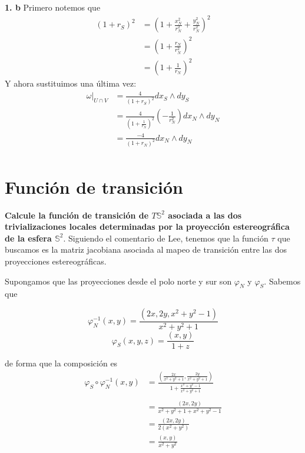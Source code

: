 \documentclass[11pt]{article}
\begin{document}
	\textbf{1. b}
	Primero notemos que
	\begin{equation*}
		\begin{split}
			(1+r_S)^2&=\left(1+\frac{x_N^2}{r_N^2}+\frac{y^2_N}{r^2_N}\right)^2\\
			&=\left(1+\frac{r_N}{r_N^2}\right)^2\\
			&=\left(1+\frac{1}{r_N}\right)^2
		\end{split}
	\end{equation*}
	Y ahora sustituimos una última vez:
	\begin{equation*}
		\begin{split}
			\omega|_{U\cap V}&=\frac{4}{(1+r_S)^2}dx_S\wedge dy_S\\
			&=\frac{4}{\left(1+\frac{1}{r_N}\right)^2}\left(-\frac{1}{r_N^2}\right)dx_N\wedge dy_N\\
			&=\frac{-4}{(1+r_N)^2}dx_N\wedge dy_N\\
		\end{split}
	\end{equation*}
	
	\newpage
	\section{Función de transición}
	\textbf{Calcule la función de transición de $T\mathbb{S}^2$ asociada a las dos trivializaciones locales determinadas por la proyección estereográfica de la esfera $\mathbb{S}^2$}.
	Siguiendo el comentario de Lee, tenemos que la función $\tau$ que buscamos es la matriz jacobiana asociada al mapeo de transición entre las dos proyecciones estereográficas.\par
	Supongamos que las proyecciones desde el polo norte y sur son $\varphi_N$ y $\varphi_S$. Sabemos que
	
	$$\varphi_N^{-1}(x,y)=\frac{(2x,2y,x^2+y^2-1)}{x^2+y^2+1}$$
	$$\varphi_S(x,y,z)=\frac{(x,y)}{1+z}$$
	
	de forma que la composición es
	\begin{align*}    \varphi_S\circ\varphi_N^{-1}(x,y)&=\frac{(\frac{2x}{x^2+y^2+1},\frac{2y}{x^2+y^2+1})}{1+\frac{x^2+y^2-1}{x^2+y^2+1}}\\ \\
		&=\frac{(2x,2y)}{x^2+y^2+1+x^2+y^2-1}\\
		&=\frac{(2x,2y)}{2(x^2+y^2)}\\
		&=\frac{(x,y)}{x^2+y^2}
	\end{align*}
	
\end{document}
